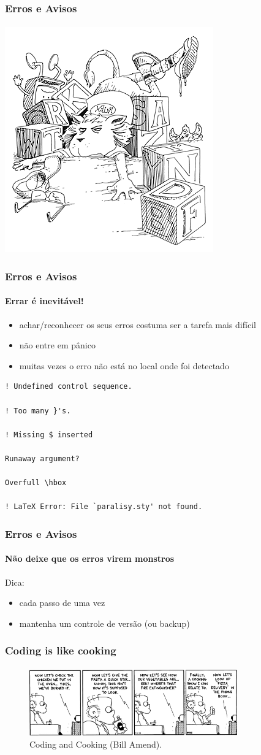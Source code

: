 \begin{frame}
\frametitle{Erros e Avisos}
\framesubtitle{}
\centering
\includegraphics[width=0.4\linewidth]{figures/lion03.png}
\end{frame}


\begin{frame}[fragile]
\frametitle{Erros e Avisos}
\framesubtitle{Errar é inevitável!}

\begin{itemize}
\item achar/reconhecer os seus erros costuma ser a tarefa mais difícil
\item não entre em pânico
\item muitas vezes o erro não está no local onde foi detectado
\end{itemize}

\begin{verbatim}
! Undefined control sequence.

! Too many }'s.

! Missing $ inserted

Runaway argument?

Overfull \hbox 

! LaTeX Error: File `paralisy.sty' not found.
\end{verbatim}
\end{frame}

\begin{frame}[fragile]
\frametitle{Erros e Avisos}
\framesubtitle{Não deixe que os erros virem monstros}
Dica:
\begin{itemize}
\item cada passo de uma vez
\item mantenha um controle de versão (ou backup)
\end{itemize}
\end{frame}


\begin{frame}[fragile]
\frametitle{Coding is like cooking}
\framesubtitle{}
\begin{figure}[h!]
  \centering
  \label{fig:cooking}
  \includegraphics[width=0.8\textwidth]{figures/cooking.png}
  \caption{Coding and Cooking (Bill Amend).}
\end{figure}

\end{frame}


